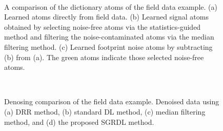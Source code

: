 \begin{figure}[htb!]
\centering
{}\\
\caption{A comparison of the dictionary atoms of the field data example. (a) Learned atoms directly from field data. (b) Learned signal atoms obtained by selecting noise-free atoms via the statistics-guided method and filtering the noise-contaminated atoms via the median filtering method. (c) Learned footprint noise atoms by subtracting (b) from (a). The green atoms indicate those selected noise-free atoms. }
\label{fig:p_atom0,p_atom1,p_atom2}
\end{figure}

\begin{figure}[htb!]
\centering
{}
\\
\caption{Denosing comparison of the field data example. Denoised data using (a) DRR method, (b) standard DL method, (c) median filtering method, and (d) the proposed SGRDL method. }
\label{fig:p-drr,p-dl-0,p-mf,p-sgrdl}
\end{figure}


